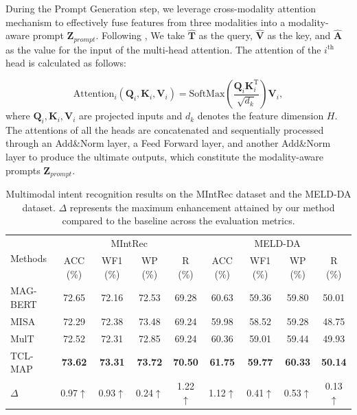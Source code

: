 \documentclass[letterpaper]{article}
\begin{document}
During the Prompt Generation step, we leverage cross-modality attention mechanism to effectively fuse features from three modalities into a modality-aware prompt $\textbf{Z}_{prompt}$. Following \cite{tsai2019multimodal}, We take $\hat{\textbf{T}}$ as the query, $\hat{\textbf{V}}$ as the key, and $\hat{\textbf{A}}$ as the value for the input of the multi-head attention. The attention of the $i^{\text{th}}$ head is calculated as follows:

\begin{equation}
\text{Attention}_{i}(\textbf{Q}_{i}, \textbf{K}_{i}, \textbf{V}_{i}) = \text{SoftMax}(\frac{\textbf{Q}_{i}\textbf{K}_{i}^{\text{T}}}{\sqrt{d_{k}}})\textbf{V}_{i},
\end{equation}
where $\textbf{Q}_{i}, \textbf{K}_{i}, \textbf{V}_{i}$ are projected inputs and $d_{k}$ denotes the feature dimension $H$. The attentions of all the heads are concatenated and sequentially processed through an Add\&Norm layer, a Feed Forward layer, and another Add\&Norm layer to produce the ultimate outputs, which constitute the modality-aware prompts $\textbf{Z}_{prompt}$.


\begin{table}[t!]
\centering
\begin{tabular}{@{\extracolsep{11pt}}l|cccc|cccc}
\toprule
\multirow{2}{*}{Methods}
& \multicolumn{4}{c|}{MIntRec}& \multicolumn{4}{c}{MELD-DA}\\

& ACC (\%) & WF1 (\%) & WP (\%) & R (\%) & ACC (\%) & WF1 (\%) & WP (\%) & R (\%) \\
\midrule
MAG-BERT & 72.65 & 72.16 & 72.53 & 69.28 & 60.63 & 59.36 & 59.80  & 50.01  \\

MISA & 72.29 & 72.38 & 73.48 & 69.24 & 59.98 & 58.52 & 59.28  & 48.75  \\

MulT & 72.52 & 72.31 & 72.85 & 69.24 & 60.36 & 59.01 & 59.44  & 49.93  \\

\midrule

TCL-MAP &
\textbf{73.62} &
\textbf{73.31} &
\textbf{73.72} &
\textbf{70.50} &
\textbf{61.75} &
\textbf{59.77} &
\textbf{60.33}  &
\textbf{50.14}  \\
$\Delta$ & 0.97$\uparrow$ & 0.93$\uparrow$ & 0.24$\uparrow$ &
1.22$\uparrow$ & 1.12$\uparrow$ & 0.41$\uparrow$ & 0.53$\uparrow$  & 0.13$\uparrow$ \\
\bottomrule
\end{tabular}
\caption{\protect \label{results}
Multimodal intent recognition results on the MIntRec dataset and the MELD-DA dataset. $\Delta$ represents the maximum enhancement attained by our method compared to the baseline across the evaluation metrics.}

\end{table}
\end{document}
